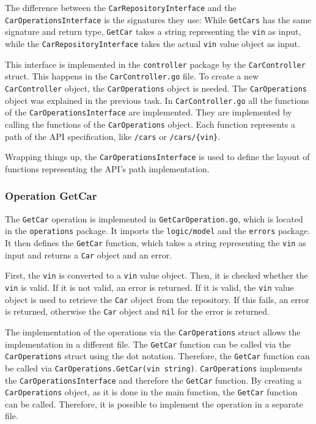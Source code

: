 The difference between the \texttt{CarRepositoryInterface} and the \texttt{CarOperationsInterface} is the signatures they use:
While \texttt{GetCars} has the same signature and return type, \texttt{GetCar} takes a string representing the \texttt{vin} as input, while the \texttt{CarRepositoryInterface} takes the actual \texttt{vin} value object as input.

This interface is implemented in the \texttt{controller} package by the \texttt{CarController} struct.
This happens in the \texttt{CarController.go} file.
To create a new \texttt{CarController} object, the \texttt{CarOperations} object is needed.
The \texttt{CarOperations} object was explained in the previous task.
In \texttt{CarController.go} all the functions of the \texttt{CarOperationsInterface} are implemented.
They are implemented by calling the functions of the \texttt{CarOperations} object.
Each function represents a path of the API specification, like \texttt{/cars} or \texttt{/cars/\{vin\}}.

Wrapping things up, the \texttt{CarOperationsInterface} is used to define the layout of functions representing the API's path implementation.

\subsubsection*{Operation GetCar}
The \texttt{GetCar} operation is implemented in \texttt{GetCarOperation.go}, which is located in the \texttt{operations} package.
It imports the \texttt{logic/model} and the \texttt{errors} package.
It then defines the \texttt{GetCar} function, which takes a string representing the \texttt{vin} as input and returns a \texttt{Car} object and an error.

First, the \texttt{vin} is converted to a \texttt{vin} value object.
Then, it is checked whether the \texttt{vin} is valid.
If it is not valid, an error is returned.
If it is valid, the \texttt{vin} value object is used to retrieve the \texttt{Car} object from the repository.
If this fails, an error is returned, otherwise the \texttt{Car} object and \texttt{nil} for the error is returned.

The implementation of the operations via the \texttt{CarOperations} struct allows the implementation in a different file.
The \texttt{GetCar} function can be called via the \texttt{CarOperations} struct using the dot notation.
Therefore, the \texttt{GetCar} function can be called via \hfill \linebreak \texttt{CarOperations.GetCar(vin string)}.
\texttt{CarOperations} implements the \hfill \linebreak \texttt{CarOperationsInterface} and therefore the \texttt{GetCar} function.
By creating a \texttt{CarOperations} object, as it is done in the main function, the \texttt{GetCar} function can be called.
Therefore, it is possible to implement the operation in a separate file.

